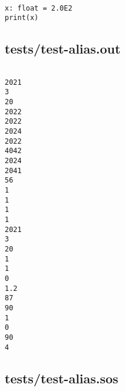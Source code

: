 \documentclass[main.tex]{subfiles}
\begin{document}
\begin{lstlisting}

x: float = 2.0E2
print(x)
\end{lstlisting}

\subsection{tests/test-alias.out}

\begin{lstlisting}

2021
3
20
2022
2022
2024
2022
4042
2024
2041
56
1
1
1
1
2021
3
20
1
1
0
1.2
87
90
1
0
90
4
\end{lstlisting}

\subsection{tests/test-alias.sos}
\end{document}
